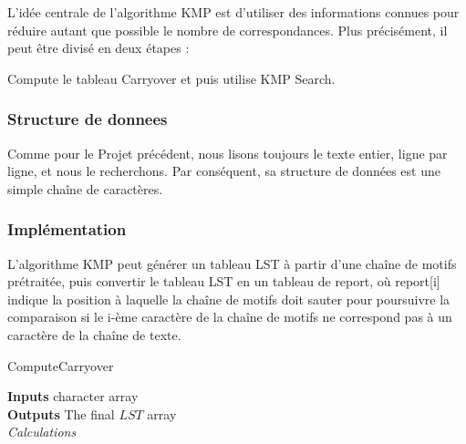\documentclass[11pt,english]{article}
\begin{document}
{    \indent L'idée centrale de l'algorithme KMP est d'utiliser des informations connues pour réduire autant que possible le nombre de correspondances. Plus précisément, il peut être divisé en deux étapes :

    \indent Compute le tableau Carryover et puis utilise KMP Search.

    \subsubsection{Structure de donnees}

    \indent 

    Comme pour le Projet précédent, nous lisons toujours le texte entier, ligne par ligne, et nous le recherchons. Par conséquent, sa structure de données est une simple chaîne de caractères.

    \subsubsection{Implémentation}

    \indent 
    
    L'algorithme KMP peut générer un tableau LST à partir d'une chaîne de motifs prétraitée, puis convertir le tableau LST en un tableau de report, où report[i] indique la position à laquelle la chaîne de motifs doit sauter pour poursuivre la comparaison si le i-ème caractère de la chaîne de motifs ne correspond pas à un caractère de la chaîne de texte.

    \indent 

    \begin{algorithm}[H]
        \caption{ComputeCarryover}\label{alg:computeCarryover}
        
        \textbf{Inputs}
            character array \\
        \textbf{Outputs}
            The final $LST$ array\\
        \textit{Calculations}\\
    \end{algorithm}

}
\end{document}
